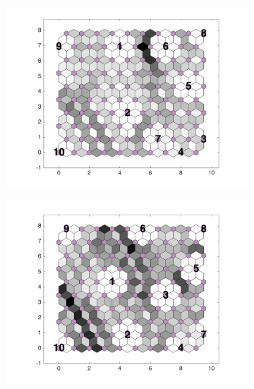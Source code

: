 \begin{figure}
\begin{subfigure}[b]{0.3\textwidth}
        \includegraphics[width=\textwidth]{../../images0.01/M31/2D/diff_dimension/combine_2D_data_between_cols3and21.png}
        \label{fig: col3and21_dist}
    \end{subfigure}
            \hfill
    \begin{subfigure}[b]{0.3\textwidth}
        \centering
        \includegraphics[width=\textwidth]{../../images0.01/M31/2D/diff_dimension/combine_2D_data_between_cols3and22.png}
        \label{fig: col3and22_dist}
    \end{subfigure}
            \hfill
    \begin{subfigure}[b]{0.3\textwidth}
        \centering

\end{subfigure}
\end{figure}
